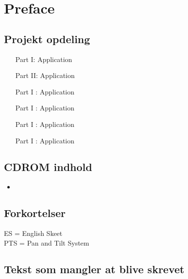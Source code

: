 \section*{Preface}

\subsection*{Projekt opdeling}
\begin{itemize}
\item [Part I:] Application
\item [Part II:] Application
\item [Part I]: Application
\item [Part I]: Application
\item [Part I]: Application
\item [Part I]: Application



\end{itemize}

\subsection*{CDROM indhold}
\begin{itemize}
\item 
\end{itemize}



\subsection*{Forkortelser}
ES = English Skeet \\
PTS = Pan and Tilt System



\newpage
\subsection*{Tekst som mangler at blive skrevet}
\listoftodos